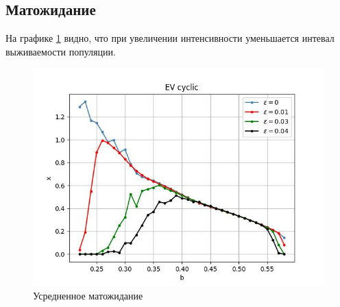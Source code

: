 \subsection{Матожидание}

    На графике \ref{EV_cyclic} видно, что при увеличении интенсивности уменьшается интевал выживаемости популяции.
        
    \begin{figure}
        \centering
        \includegraphics[width=\textwidth]{stochastic/images/EV_cyclic.jpg}
        
        \captionsetup{justification=centering}
        \caption{Усредненное матожидание}
        \label{EV_cyclic}
    \end{figure}
